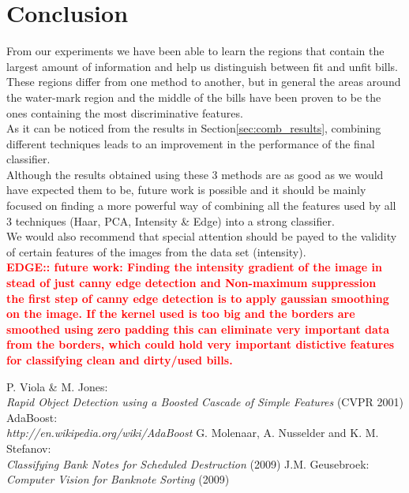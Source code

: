 \documentclass[11pt,twocolumn]{article}
\newcommand{\todo}[1]{\textcolor{red}{\textbf{#1}}}
\newcommand{\tit}{\textit}
\begin{document}
	\section{Conclusion}\label{sec:conclusion}
		\hspace*{10px}From our experiments we have been able to learn the regions
		that contain the largest amount of information and help us distinguish
		between fit and unfit bills. These regions differ from one method to another,
		but in general the areas around the water-mark region and the middle of the
		bills have been proven to be the ones containing the most discriminative
		features.\\ 
		\hspace*{10px}As it can be noticed from the results in
		Section\ref{sec:comb_results}, combining different techniques leads to an
		improvement in the performance of the final classifier.\\
		\hspace*{10px}Although the results obtained using these 3 methods are as good
		as we would have expected them to be, future work is possible and it should
		be mainly focused on finding a more powerful way of combining all the
		features used by all 3 techniques (Haar, PCA, Intensity \& Edge) into a
		strong classifier.\\ \hspace*{10px}We would also recommend that special
		attention should be payed to the validity of certain features of the images
		from the data set (intensity).\\
		
		\todo{EDGE::  future work: Finding the intensity gradient of the image in
		stead of just canny edge detection and Non-maximum suppression\\
		the first step of canny edge detection is to apply gaussian smoothing on the
		image. If the kernel used is too big and the borders are smoothed using zero
		padding this can eliminate very important data from the borders, which could
		hold very important distictive features for classifying clean and dirty/used
		bills.}
		
		 
		\begin{thebibliography}{3} 
				P. Viola \& M. Jones:\\
				\tit{Rapid Object Detection using a Boosted Cascade of Simple Features}
				(CVPR 2001)
				AdaBoost: \\
				\tit{http://en.wikipedia.org/wiki/AdaBoost}	
			G. Molenaar, A. Nusselder and K. M. Stefanov: \\
				\tit{Classifying Bank Notes for Scheduled Destruction} (2009)
			 J.M. Geusebroek: \\
				\tit{Computer Vision for Banknote Sorting} (2009)		
		\end{thebibliography}
\end{document}
